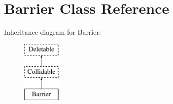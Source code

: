 \hypertarget{class_barrier}{\section{Barrier Class Reference}
\label{class_barrier}
}
Inheritance diagram for Barrier\+:\begin{figure}[H]
\begin{center}
\leavevmode
\includegraphics[height=3.000000cm]{class_barrier}
\end{center}
\end{figure}
